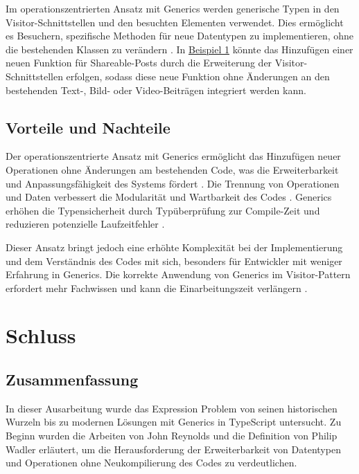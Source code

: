 \documentclass{easychair}
\begin{document}
Im operationszentrierten Ansatz mit Generics werden generische Typen in den Visitor-Schnittstellen und den besuchten Elementen verwendet. Dies ermöglicht es Besuchern, spezifische Methoden für neue Datentypen zu implementieren, ohne die bestehenden Klassen zu verändern \cite{hughes1989functional}. In \hyperlink{beispiel1}{Beispiel 1} könnte das Hinzufügen einer neuen Funktion für Shareable-Posts durch die Erweiterung der Visitor-Schnittstellen erfolgen, sodass diese neue Funktion ohne Änderungen an den bestehenden Text-, Bild- oder Video-Beiträgen integriert werden kann.

\subsection{Vorteile und Nachteile}

Der operationszentrierte Ansatz mit Generics ermöglicht das Hinzufügen neuer Operationen ohne Änderungen am bestehenden Code, was die Erweiterbarkeit und Anpassungsfähigkeit des Systems fördert \cite{rozentals2019typescript}. Die Trennung von Operationen und Daten verbessert die Modularität und Wartbarkeit des Codes \cite{hughes1989functional}. Generics erhöhen die Typensicherheit durch Typüberprüfung zur Compile-Zeit und reduzieren potenzielle Laufzeitfehler \cite{typescript2019deepdive}.

Dieser Ansatz bringt jedoch eine erhöhte Komplexität bei der Implementierung und dem Verständnis des Codes mit sich, besonders für Entwickler mit weniger Erfahrung in Generics. Die korrekte Anwendung von Generics im Visitor-Pattern erfordert mehr Fachwissen und kann die Einarbeitungszeit verlängern \cite{Krishnamurthi1998}.


\section{Schluss}
  \subsection{Zusammenfassung}

  In dieser Ausarbeitung wurde das Expression Problem von seinen historischen Wurzeln bis zu modernen Lösungen mit Generics in TypeScript untersucht. Zu Beginn wurden die Arbeiten von John Reynolds \cite{Reynolds1978} und die Definition von Philip Wadler \cite{wadler1998expression} erläutert, um die Herausforderung der Erweiterbarkeit von Datentypen und Operationen ohne Neukompilierung des Codes zu verdeutlichen.
  
\end{document}
